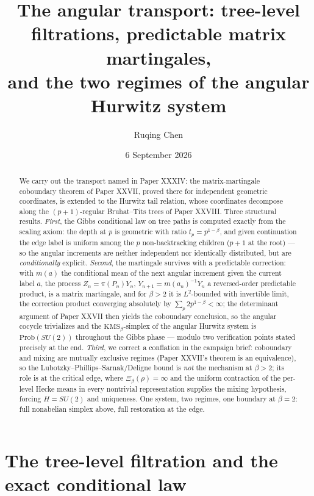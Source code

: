 \documentclass[11pt]{amsart}
\title[The angular transport]{The angular transport: tree-level filtrations, predictable matrix martingales,\\ and the two regimes of the angular Hurwitz system}
\author{Ruqing Chen}
\date{6 September 2026}
\theoremstyle{remark}
\newcommand{\Prob}{\mathrm{Prob}}
\begin{document}
\begin{abstract}
We carry out the transport named in Paper XXXIV: the matrix-martingale coboundary theorem
of Paper XXVII, proved there for independent geometric coordinates, is extended to the
Hurwitz tail relation, whose coordinates decompose along the $(p{+}1)$-regular
Bruhat--Tits trees of Paper XXVIII. Three structural results. \emph{First}, the Gibbs
conditional law on tree paths is computed exactly from the scaling axiom: the depth at
$p$ is geometric with ratio $t_p=p^{1-\beta}$, and given continuation the edge label is
uniform among the $p$ non-backtracking children ($p{+}1$ at the root) --- so the angular
increments are neither independent nor identically distributed, but are
\emph{conditionally} explicit. \emph{Second}, the martingale survives with a predictable
correction: with $m(a)$ the conditional mean of the next angular increment given the
current label $a$, the process $Z_n=\pi(P_n)Y_n$, $Y_{n+1}=m(a_n)^{-1}Y_n$ a
reversed-order predictable product, is a matrix martingale, and for $\beta>2$ it is
$L^2$-bounded with invertible limit, the correction product converging absolutely by
$\sum_p2p^{1-\beta}<\infty$; the determinant argument of Paper XXVII then yields the
coboundary conclusion, so the angular cocycle trivializes and the
$\mathrm{KMS}_\beta$-simplex of the angular Hurwitz system is $\Prob(SU(2))$ throughout
the Gibbs phase --- modulo two verification points stated precisely at the end.
\emph{Third}, we correct a conflation in the campaign brief: coboundary and mixing are
mutually exclusive regimes (Paper XXVII's theorem is an equivalence), so the
Lubotzky--Phillips--Sarnak/Deligne bound is \emph{not} the mechanism at $\beta>2$; its
role is at the critical edge, where $\Xi_\beta(\rho)=\infty$ and the uniform contraction
of the per-level Hecke means in every nontrivial representation supplies the mixing
hypothesis, forcing $H=SU(2)$ and uniqueness. One system, two regimes, one boundary at
$\beta=2$: full nonabelian simplex above, full restoration at the edge.
\end{abstract}

\maketitle

\section{The tree-level filtration and the exact conditional law}\label{sec:filtration}
\end{document}
